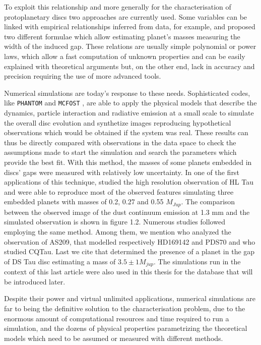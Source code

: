 \documentclass[a4paper,10pt]{report}
\begin{document}
To exploit this relationship and more generally for the characterisation of protoplanetary discs
two approaches are currently used. Some variables can be linked with empirical relationships 
inferred from data,
for example, \citet{Lodato_2019} and \citet{kanagawa} proposed 
two different formulae which allow estimating planet's masses measuring
the width of the induced gap. These relations are usually simple polynomial or power laws, which 
allow a fast computation of unknown properties and can be easily explained with theoretical
arguments but, on the other end,
lack in accuracy and precision requiring the use of more advanced tools.

Numerical simulations are today's response to these needs. Sophisticated codes,
 like \lstinline{PHANTOM} \citep{phantom} and \lstinline{MCFOST} \citep{mcfost1,mcfost2}, 
are able to apply the physical models that describe the dynamics, particle interaction and radiative emission at a small scale 
to simulate the overall disc evolution and synthetize images reproducing hypothetical observations which would be 
obtained if the system was real.
These results can thus be directly compared  with observations in the data 
space to check the assumptions made to start the simulation and 
search the parameters which provide the best fit.
With this method, the masses of some planets embedded 
in discs' gaps were measured with relatively low uncertainty.
In one of the first applications of this technique, \citet{Dipierro_2015} studied
the high resolution observation of HL Tau 
and were able to reproduce most of the observed features 
simulating three embedded planets with masses of 0.2,  0.27  and  0.55 $M_{Jup}$.
The comparison between the observed image of the dust continuum emission at 1.3 mm and the simulated observation
is shown in figure 1.2.
Numerous studies followed employing the same method. Among them, we mention \citet{refId0} who analyzed
the observation of AS209, \citet{Toci_2019,Toci_2020} that modelled respectively HD169142 and PDS70 and 
\citet{Ubeira_Gabellini_2019} who studied CQTau.
Last we cite \citet{dstauv} that determined the
presence of a planet in the gap of DS Tau disc estimating a mass of $3.5 \pm 1 M_{jup}$. The simulations run 
in the context of this last article were also used in this thesis for the database that will be introduced later.

Despite their power and virtual unlimited applications, numerical simulations are far to being the definitive solution
to the characterisation problem, due to the enormous amount of computational resources and time 
required to run a simulation, and the dozens of physical properties parametrizing the theoretical models which need to be 
assumed or measured with different methods.
\end{document}
